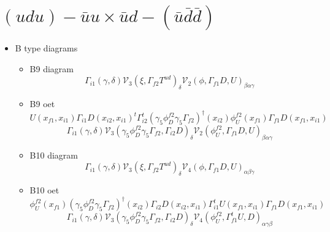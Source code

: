 \documentclass{article}[12pt]
\begin{document}
\section{$(udu)-\bar{u}u \times \bar{u}d-(\bar{u}\bar{d}\bar{d}) $}
\begin{itemize}
\item B type diagrams
\begin{itemize}
\item B9 diagram
$$
\Gamma_{i1}\left(\gamma,\delta\right){\mathcal V}_3\left(\xi,\Gamma_{f2}T^{ud}\right)_\delta{\mathcal V}_2\left(\phi,\Gamma_{f1}D,U\right)_{\beta\alpha\gamma}
$$
\item B9 oet
$$
U(x_{f1},x_{i1})\Gamma_{i1}D(x_{i2},x_{i1})^t\Gamma_{i2}^t
(\gamma_5\phi_D^{f2}\gamma_5\Gamma_{f2})^{\dagger}(x_{i2})
\phi_U^{f2}(x_{f1})\Gamma_{f1}D(x_{f1},x_{i1})
$$
$$
\Gamma_{i1}\left(\gamma,\delta\right){\mathcal V}_3\left(\gamma_5\phi_D^{f2}\gamma_5\Gamma_{f2},\Gamma_{i2}D\right)_{\delta}
{\mathcal V}_2\left(\phi_U^{f2},\Gamma_{f1}D,U\right)_{\beta\alpha\gamma}
$$
\item B10 diagram
$$
\Gamma_{i1}\left(\gamma,\delta\right){\mathcal V}_3\left(\xi,\Gamma_{f2}T^{ud}\right)_\delta{\mathcal V}_4\left(\phi,\Gamma_{f1}D,U\right)_{\alpha\beta\gamma}
$$
\item B10 oet
$$
\phi_U^{f2}(x_{f1})(\gamma_5\phi_D^{f2}\gamma_5\Gamma_{f2})^{\dagger}(x_{i2})\Gamma_{i2}D(x_{i2},x_{i1})\Gamma_{i1}^t
U(x_{f1},x_{i1})\Gamma_{f1}D(x_{f1},x_{i1})
$$
$$
\Gamma_{i1}\left(\gamma,\delta\right){\mathcal V}_3\left(\gamma_5\phi_D^{f2}\gamma_5\Gamma_{f2},\Gamma_{i2}D\right)_{\delta}
{\mathcal V}_4\left(\phi_U^{f2},\Gamma_{f1}^tU,D\right)_{\alpha\gamma\beta}
$$


\end{itemize}
\end{itemize}
\end{document}

